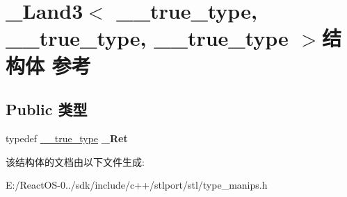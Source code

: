 \hypertarget{struct___land3_3_01____true__type_00_01____true__type_00_01____true__type_01_4}{}\section{\+\_\+\+Land3$<$ \+\_\+\+\_\+true\+\_\+type, \+\_\+\+\_\+true\+\_\+type, \+\_\+\+\_\+true\+\_\+type $>$结构体 参考}
\label{struct___land3_3_01____true__type_00_01____true__type_00_01____true__type_01_4}
\subsection*{Public 类型}
\begin{DoxyCompactItemize}
\item 
\mbox{\label{struct___land3_3_01____true__type_00_01____true__type_00_01____true__type_01_4_abd130d9e8b3b90c5431b726266d328df}} 
typedef \hyperlink{struct____true__type}{\+\_\+\+\_\+true\+\_\+type} {\bfseries \+\_\+\+Ret}
\end{DoxyCompactItemize}


该结构体的文档由以下文件生成\+:\begin{DoxyCompactItemize}
\item 
E\+:/\+React\+O\+S-\/0../sdk/include/c++/stlport/stl/type\+\_\+manips.\+h\end{DoxyCompactItemize}
